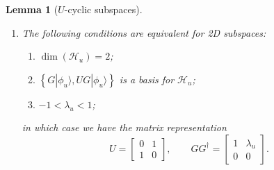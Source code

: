 \documentclass[letterpaper,onecolumn,11pt,accepted=2026-02-14]{quantumarticle}
\newtheorem{lemma}{Lemma}
\theoremstyle{remark}
\theoremstyle{plain}
\newcommand{\ket}[1]{|#1\rangle}
\begin{document}
\begin{lemma}[$U$-cyclic subspaces]
\begin{enumerate}
\begin{equation}
\begin{bmatrix}
        \end{bmatrix}.
    \end{equation}
    \item The following conditions are equivalent  for 2D subspaces:
    \begin{enumerate}
        \item $\dim(\mathcal{H}_u)=2$;
        \item $\left\{G\ket{\phi_u},UG\ket{\phi_u}\right\}$ is a basis for $\mathcal{H}_u$;
        \item $-1<\lambda_u<1$;
    \end{enumerate}
    in which case we have the matrix representation
    \begin{equation}
        U=\begin{bmatrix}
            0 & 1\\
            1 & 0
        \end{bmatrix},\qquad
        GG^\dagger=\begin{bmatrix}
            1 & \lambda_u\\
            0 & 0
        \end{bmatrix}.
    \end{equation}
\end{enumerate}
\end{lemma}
\end{document}
